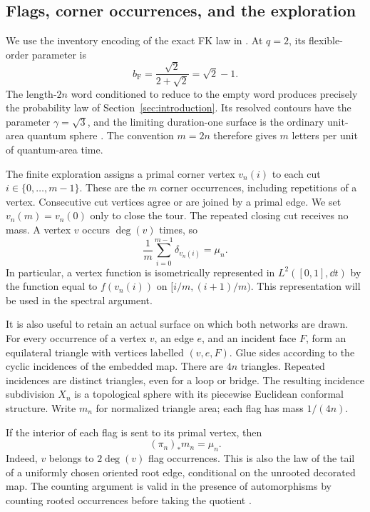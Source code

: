\subsection{Flags, corner occurrences, and the exploration}

We use the inventory encoding of the exact FK law in
\cite[Proposition~3.1 and Lemma~3.2]{C}.  At \(q=2\), its flexible-order
parameter is
\[
 b_{\mathrm F}=\frac{\sqrt2}{2+\sqrt2}=\sqrt2-1.
\]
The length-\(2n\) word conditioned to reduce to the empty word produces
precisely the probability law of Section~\ref{sec:introduction}.  Its resolved
contours have the parameter \(\gamma=\sqrt3\), and the limiting duration-one
surface is the ordinary unit-area quantum sphere
\cite[Theorem~3.4]{C}.  The convention \(m=2n\) therefore gives \(m\) letters
per unit of quantum-area time.

The finite exploration assigns a primal corner vertex \(v_n(i)\) to each cut
\(i\in\{0,\ldots,m-1\}\).  These are the \(m\) corner occurrences, including
repetitions of a vertex.  Consecutive cut vertices agree or are joined by a
primal edge.  We set \(v_n(m)=v_n(0)\) only to close the tour.  The repeated
closing cut receives no mass.  A vertex \(v\) occurs \(\deg(v)\) times, so
\begin{equation}\label{eq:corner-pushforward}
 \frac1m\sum_{i=0}^{m-1}\delta_{v_n(i)}=\mu_n.
\end{equation}
In particular, a vertex function is isometrically represented in
\(L^2([0,1],\dd t)\) by the function equal to \(f(v_n(i))\) on
\([i/m,(i+1)/m)\).  This representation will be used in the spectral
argument.

It is also useful to retain an actual surface on which both networks are
drawn.  For every occurrence of a vertex \(v\), an edge \(e\), and an incident
face \(F\), form an equilateral triangle with vertices labelled \((v,e,F)\).
Glue sides according to the cyclic incidences of the embedded map.  There are
\(4n\) triangles.  Repeated incidences are distinct triangles, even for a
loop or bridge.  The resulting incidence subdivision \(X_n\) is a topological
sphere with its piecewise Euclidean conformal structure.  Write \(m_n\) for
normalized triangle area; each flag has mass \(1/(4n)\).

If the interior of each flag is sent to its primal vertex, then
\begin{equation}\label{eq:flag-pushforward}
 (\pi_n)_*m_n=\mu_n.
\end{equation}
Indeed, \(v\) belongs to \(2\deg(v)\) flag occurrences.  This is also the
law of the tail of a uniformly chosen oriented root edge, conditional on the
unrooted decorated map.  The counting argument is valid in the presence of
automorphisms by counting rooted occurrences before taking the quotient
\cite[Lemma~2.2]{C}.

